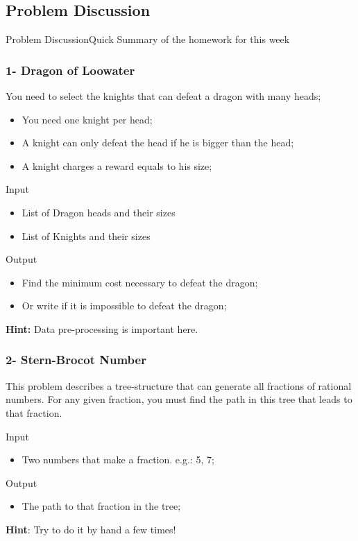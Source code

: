 \subsection{Problem Discussion}
\begin{frame}{Problem Discussion}{Quick Summary of the homework for this week}

\end{frame}


\begin{frame}
\frametitle{1- Dragon of Loowater}
  You need to select the knights that can defeat a dragon with many heads;
  \begin{itemize}
    \item You need one knight per head;
    \item A knight can only defeat the head if he is bigger than the head;
    \item A knight charges a reward equals to his size;
  \end{itemize}

  \begin{block}{Input}
    \begin{itemize}
      \item List of Dragon heads and their sizes
      \item List of Knights and their sizes
    \end{itemize}
  \end{block}

  \begin{exampleblock}{Output}
    \begin{itemize}
      \item Find the minimum cost necessary to defeat the dragon;
      \item Or write if it is impossible to defeat the dragon;
    \end{itemize}
  \end{exampleblock}

  {\bf Hint:} Data pre-processing is important here.
\end{frame}

\begin{frame}
  \frametitle{2- Stern-Brocot Number}
  This problem describes a tree-structure that can generate all fractions of rational numbers. For any given fraction, you must find the path in this tree that leads to that fraction.\bigskip

  \begin{block}{Input}
    \begin{itemize}
    \item Two numbers that make a fraction. e.g.: 5, 7;
    \end{itemize}
  \end{block}

  \begin{exampleblock}{Output}
    \begin{itemize}
    \item The path to that fraction in the tree;
    \end{itemize}
  \end{exampleblock}

  {\bf Hint}: Try to do it by hand a few times!
\end{frame}

